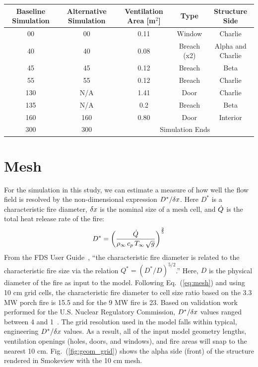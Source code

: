\documentclass[11pt,oneside]{book}
\begin{document}
\bigskip
\begin{minipage}{.8\linewidth}
\centering
{}\label{tab:vents}
\begin{tabular}{ccccc}
\toprule[1.5pt]
Baseline Simulation & Alternative Simulation & Ventilation Area [m$^2$] & Type & Structure Side \\
\midrule
00    &  00   & 0.11 & Window      & Charlie \\
40    &  40   & 0.08 & Breach (x2) & Alpha and Charlie \\
45    &  45   & 0.12 & Breach      & Beta \\
55    &  55   & 0.12 & Breach      & Charlie \\     
130   &  N/A  & 1.41 & Door        & Charlie \\
135   &  N/A  & 0.2  & Breach      & Beta \\        
160   &  160  & 0.80 & Door        & Interior \\
300   &  300  & \multicolumn{3}{c}{Simulation Ends}  \\
\bottomrule[1.25pt]
\end{tabular}\par
\bigskip
\end{minipage}

\section{Mesh}
\label{mesh}

For the simulation in this study, we can estimate a measure of how well the flow field is resolved by the non-dimensional expression $D^*/\delta x$. Here $D^*$ is a characteristic fire diameter, $\delta x$ is the nominal size of a mesh cell, and $\dot{Q}$ is the total heat release rate of the fire:
\begin{equation}
D^* = \left(
     \frac{\dot{Q}}{\rho_\infty \, c_p \, T_\infty \, \sqrt{g} }
     \right)^\frac{2}{5} 
\label{eq:mesh}
\end{equation}   
From the FDS User Guide~\cite{FDS_Users_Guide}, ``the characteristic fire diameter is related to the characteristic fire size via the
relation $Q^* = (D^*/D)^{5/2}$.'' Here, $D$ is the physical diameter of the fire as input to the model. Following Eq.~(\ref{eq:mesh}) and using 10 cm grid cells, the characteristic fire diameter to cell size ratio based on the 3.3 MW porch fire is 15.5 and for the 9 MW fire is 23. Based on validation work performed for the U.S. Nuclear Regulatory Commission, $D^*/\delta x$ values ranged between 4 and 1~\cite{NUREG_1824}. The grid resolution used in the model falls within typical, engineering $D^*/\delta x$ values. As a result, all of the input model geometry lengths, ventilation openings (holes, doors, and windows), and fire areas will snap to the nearest 10 cm. Fig.~(\ref{fig:geom_grid}) shows the 
alpha side (front) of the structure rendered in Smokeview with the 10 cm mesh.
\end{document}
